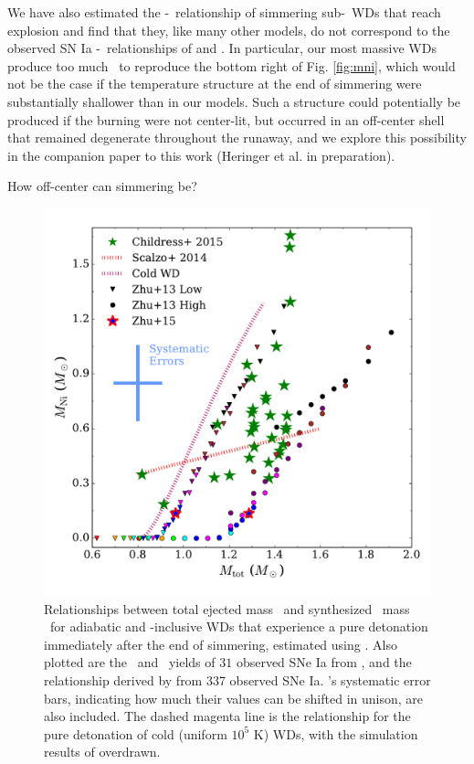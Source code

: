 
We have also estimated the \Mtot-\MNi\ relationship of simmering sub-\Mch\ WDs that reach explosion and find that they, like many other models, do not correspond to the observed SN Ia \Mtot-\MNi\ relationships of \cite{scalzrs14} and \cite{chil+15}.  In particular, our most massive WDs produce too much \Ni\ to reproduce the bottom right of Fig. \ref{fig:mni}, which would not be the case if the temperature structure at the end of simmering were substantially shallower than in our models.  Such a structure could potentially be produced if the burning were not center-lit, but occurred in an off-center shell that remained degenerate throughout the runaway, and we explore this possibility in the companion paper to this work (Heringer et al. in preparation).


How off-center can simmering be?

\begin{figure}
\centering
\includegraphics[angle=0,width=0.6\columnwidth]{conclusion/figures/c_MNi.pdf}
\caption{Relationships between total ejected mass \Mtot\ and synthesized \Ni\ mass \MNi\ for adiabatic and \dnabconv-inclusive WDs that experience a pure detonation immediately after the end of simmering, estimated using \cite{sim+10}.  Also plotted are the \Mtot\ and \MNi\ yields of $31$ observed SNe Ia from \cite{chil+15}, and the relationship derived by \cite{scalzrs14} from 337 observed SNe Ia.  \cite{chil+15}'s systematic error bars, indicating how much their values can be shifted in unison, are also included.  The dashed magenta line is the relationship for the pure detonation of cold (uniform $10^5$ K) WDs, with the simulation results of \cite{sim+10} overdrawn.}
\label{fig:c_mcmce_mni}
\end{figure}

